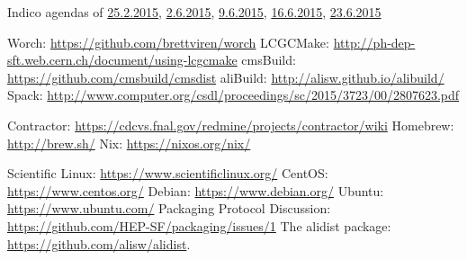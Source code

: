 \documentclass[12pt,a4paper]{article}
\begin{document}
\begin{thebibliography}{9}
 Indico agendas of \href{https://indico.cern.ch/event/373973/}{25.2.2015}, \href{https://indico.cern.ch/event/398344/}{2.6.2015}, \href{https://indico.cern.ch/event/400272/}{9.6.2015}, \href{https://indico.cern.ch/event/402229/}{16.6.2015}, \href{https://indico.cern.ch/event/403790/}{23.6.2015}

 Worch: \url{https://github.com/brettviren/worch}
 LCGCMake: \url{http://ph-dep-sft.web.cern.ch/document/using-lcgcmake}
 cmsBuild: \url{https://github.com/cmsbuild/cmsdist}
 aliBuild: \url{http://alisw.github.io/alibuild/}
 Spack: \url{http://www.computer.org/csdl/proceedings/sc/2015/3723/00/2807623.pdf}
    
 Contractor: \url{https://cdcvs.fnal.gov/redmine/projects/contractor/wiki}
 Homebrew: \url{http://brew.sh/}
 Nix: \url{https://nixos.org/nix/}

 Scientific Linux: \url{https://www.scientificlinux.org/}
 CentOS: \url{https://www.centos.org/}
 Debian: \url{https://www.debian.org/}
 Ubuntu: \url{https://www.ubuntu.com/}
 Packaging Protocol Discussion:  \url{https://github.com/HEP-SF/packaging/issues/1}
 The alidist package: \url{https://github.com/alisw/alidist}.
\end{thebibliography}
\end{document}
